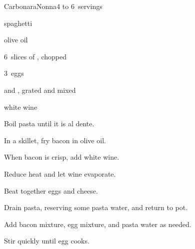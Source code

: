 \begin{recipe}{Carbonara}{Nonna}{4 to 6~servings}

\begin{ingredients}
\item {} spaghetti
\item {} olive oil
\item 6~slices of , chopped
\item 3~eggs
\item \C{\twothird}  and , grated and mixed
\item \C{\half} white wine
\end{ingredients}

\begin{directions}
\item Boil pasta until it is al dente.
\item In a skillet, fry bacon in olive oil.
\item When bacon is crisp, add white wine.
\item Reduce heat and let wine evaporate.
\item Beat together eggs and cheese.
\item Drain pasta, reserving some pasta water, and return to pot.
\item Add bacon mixture, egg mixture, and pasta water as needed.
\item Stir quickly until egg cooks.
\end{directions}

\end{recipe}
